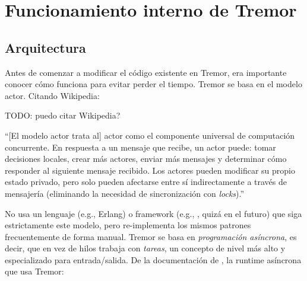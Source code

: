 \chapter{Funcionamiento interno de Tremor}\label{annex:tremor}

\section{Arquitectura}

Antes de comenzar a modificar el código existente en Tremor, era importante
conocer cómo funciona para evitar perder el tiempo. Tremor se basa en el modelo
actor. Citando Wikipedia:

TODO: puedo citar Wikipedia?


``[El modelo actor trata al] actor como el componente universal de computación
concurrente. En respuesta a un mensaje que recibe, un actor puede: tomar
decisiones locales, crear más actores, enviar más mensajes y determinar cómo
responder al siguiente mensaje recibido. Los actores pueden modificar su propio
estado privado, pero solo pueden afectarse entre sí indirectamente a través de
mensajería (eliminando la necesidad de sincronización con
\emph{locks}).''~\cite{wikiactor}

No usa un lenguaje (e.g., Erlang) o framework (e.g., , quizá
en el futuro) que siga estrictamente este modelo, pero re-implementa los mismos
patrones frecuentemente de forma manual. Tremor se basa en \emph{programación
asíncrona}, es decir, que en vez de hilos trabaja con \emph{tareas}, un concepto
de nivel más alto y especializado para entrada/salida. De la documentación de
, la runtime asíncrona que usa Tremor:


